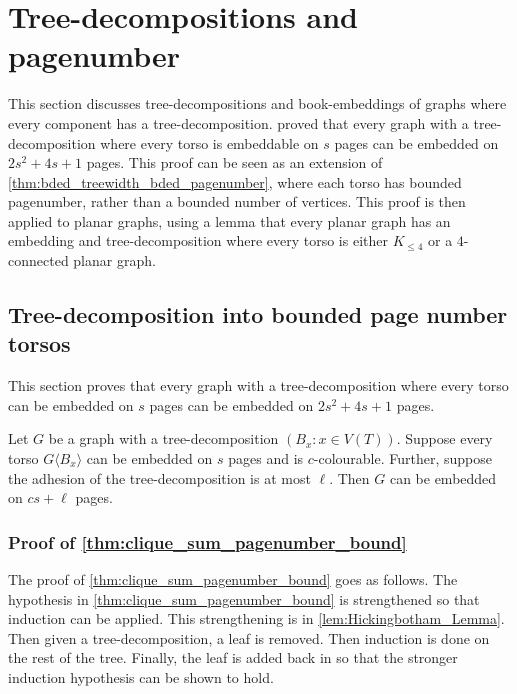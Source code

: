 \section{Tree-decompositions and pagenumber}\label{sec:BoundedPagenumber}
This section discusses tree-decompositions and book-embeddings of graphs where every component has a tree-decomposition. \textcite{hickingbothamStackNumberCliqueSum2023} proved that every graph with a tree-decomposition where every torso is embeddable on $s$ pages can be embedded on $2s^2 + 4s + 1$ pages. This proof can be seen as an extension of \cref{thm:bded_treewidth_bded_pagenumber}, where each torso has bounded pagenumber, rather than a bounded number of vertices. This proof is then applied to planar graphs, using a lemma that every planar graph has an embedding and tree-decomposition where every torso is either $K_{\leq 4}$ or a $4$-connected planar graph. 

\subsection{Tree-decomposition into bounded page number torsos}\label{ssec:Clique_sum_Pagenumber_bound}

This section proves that every graph with a tree-decomposition where every torso can be embedded on $s$ pages can be embedded on $2s^2 + 4s + 1$ pages. 

\begin{theorem}\label{thm:clique_sum_pagenumber_bound}
	Let \(G\) be a graph with a tree-decomposition \((B_x: x \in V(T))\). Suppose every torso \(G \langle B_x \rangle\) can be embedded on \(s\) pages and is \(c\)-colourable. Further, suppose the adhesion of the tree-decomposition is at most \(\ell\).
	Then $G$ can be embedded on \( cs + \ell \) pages.
\end{theorem}

\subsubsection{Proof of \cref{thm:clique_sum_pagenumber_bound}}
The proof of \cref{thm:clique_sum_pagenumber_bound} goes as follows.
The hypothesis in \cref{thm:clique_sum_pagenumber_bound} is strengthened so that induction can be applied. This strengthening is in \cref{lem:Hickingbotham_Lemma}. Then given a tree-decomposition, a leaf is removed. Then induction is done on the rest of the tree. Finally, the leaf is added back in so that the stronger induction hypothesis can be shown to hold. 

